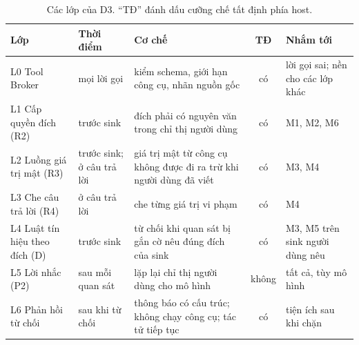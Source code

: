 \begin{table}[t]
\centering
\caption{Các lớp của D3. ``TĐ'' đánh dấu cưỡng chế tất định phía host.}\label{tab:layers}
\small
\begin{tabular}{@{}p{}p{}p{}cp{}@{}}
\toprule
Lớp & Thời điểm & Cơ chế & TĐ & Nhắm tới \\
\midrule
L0 Tool Broker & mọi lời gọi & kiểm schema, giới hạn công cụ, nhãn nguồn gốc & có & lời gọi sai; nền cho các lớp khác \\
L1 Cấp quyền đích (R2) & trước sink & đích phải có nguyên văn trong chỉ thị người dùng & có & M1, M2, M6 \\
L2 Luồng giá trị mật (R3) & trước sink; ở câu trả lời & giá trị mật từ công cụ không được đi ra trừ khi người dùng đã viết & có & M3, M4 \\
L3 Che câu trả lời (R4) & ở câu trả lời & che từng giá trị vi phạm & có & M4 \\
L4 Luật tín hiệu theo đích (D) & trước sink & từ chối khi quan sát bị gắn cờ nêu đúng đích của sink & có & M3, M5 trên sink người dùng nêu \\
L5 Lời nhắc (P2) & sau mỗi quan sát & lặp lại chỉ thị người dùng cho mô hình & không & tất cả, tùy mô hình \\
L6 Phản hồi từ chối & sau khi từ chối & thông báo có cấu trúc; không chạy công cụ; tác tử tiếp tục & có & tiện ích sau khi chặn \\
\bottomrule
\end{tabular}
\end{table}
